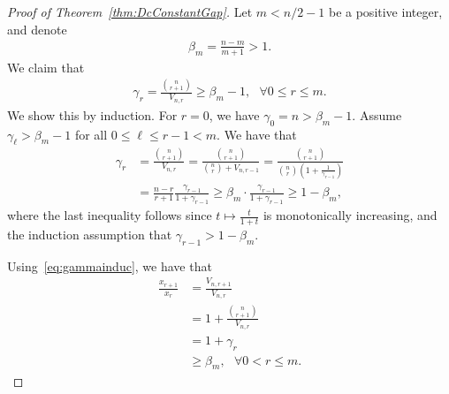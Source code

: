 \documentclass[article,doublecolumn]{IEEEtran}
\begin{document}
\begin{proof}[Proof of Theorem~\ref{thm:DcConstantGap}]
Let $m<n/2-1$ be a positive integer, and denote
\begin{align}
\beta_m=\frac{n-m}{m+1}>1.    
\end{align}
We claim that 
\begin{align}
\gamma_r=\frac{{{n}\choose{r+1}}}{V_{n,r}}\geq \beta_m-1,~~~ \forall 0\leq r\leq m.   
\label{eq:gammainduc}
\end{align}
We show this by induction. For $r=0$, we have $\gamma_0=n>\beta_m-1$. Assume $\gamma_\ell>\beta_m-1$ for all $0\leq \ell\leq r-1<m$. We have that
\begin{align}
\gamma_{r}&=\frac{{{n}\choose{r+1}}}{V_{n,r}}=\frac{{{n}\choose{r+1}}}{{{n}\choose{r}}+V_{n,r-1}}=\frac{{{n}\choose{r+1}}}{{{n}\choose{r}}\left(1+\frac{1}{\gamma_{r-1}}\right)}\nonumber\\
&=\frac{n-r}{r+1}\frac{\gamma_{r-1}}{1+\gamma_{r-1}}\geq \beta_m\cdot \frac{\gamma_{r-1}}{1+\gamma_{r-1}}\geq 1-\beta_m,   
\end{align}
where the last inequality follows since $t\mapsto\frac{t}{1+t}$ is monotonically increasing, and the induction assumption that $\gamma_{r-1}>1-\beta_m$. 

Using~\eqref{eq:gammainduc}, we have that
\begin{align}
\frac{x_{r+1}}{x_r}&=\frac{V_{n,r+1}}{V_{n,r}}\\
&=1+\frac{{{n}\choose{r+1}}}{V_{n,r}}\\
&=1+\gamma_r\\
&\geq \beta_m,~~~  \forall 0<r\leq m.
\label{eq:xrratiobound}
\end{align}


\end{proof}
\end{document}
